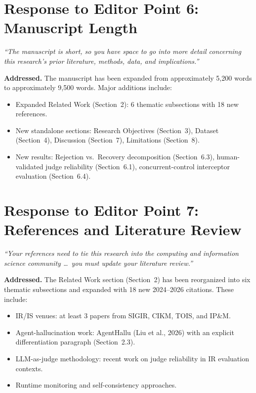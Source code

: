 \documentclass[11pt]{article}
\newcommand{\editortext}[1]{\textit{\color{gray}#1}}
\begin{document}
\section{Response to Editor Point 6: Manuscript Length}

\editortext{``The manuscript is short, so you have space to go into more
detail concerning this research's prior literature, methods, data, and
implications.''}

\textbf{Addressed.} The manuscript has been expanded from approximately
5,200 words to approximately 9,500 words. Major additions include:
\begin{itemize}[nosep]
  \item Expanded Related Work (Section~2): 6 thematic subsections with
        18 new references.
  \item New standalone sections: Research Objectives (Section~3), Dataset
        (Section~4), Discussion (Section~7), Limitations (Section~8).
  \item New results: Rejection vs.\ Recovery decomposition (Section~6.3),
        human-validated judge reliability (Section~6.1), concurrent-control
        interceptor evaluation (Section~6.4).
\end{itemize}

\section{Response to Editor Point 7: References and Literature Review}

\editortext{``Your references need to tie this research into the computing
and information science community \ldots\ you must update your literature
review.''}

\textbf{Addressed.} The Related Work section (Section~2) has been
reorganized into six thematic subsections and expanded with 18 new
2024--2026 citations. These include:
\begin{itemize}[nosep]
  \item IR/IS venues: at least 3 papers from SIGIR, CIKM, TOIS, and IP\&M.
  \item Agent-hallucination work: AgentHallu (Liu et al., 2026) with an
        explicit differentiation paragraph (Section~2.3).
  \item LLM-as-judge methodology: recent work on judge reliability in
        IR evaluation contexts.
  \item Runtime monitoring and self-consistency approaches.
\end{itemize}
\end{document}
